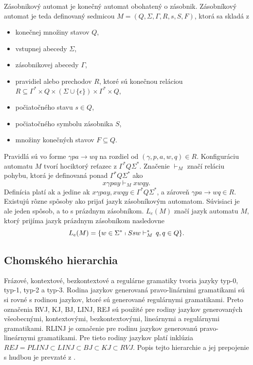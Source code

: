 \begin{definition}
\label{def:zasaut}
Zásobnikový automat je konečný automat obohatený o zásobnik. Zásobníkový automat je teda definovaný sedmicou $M = (Q,\Sigma, \Gamma , R,s,S,F)$, ktorá sa skladá z
\begin{itemize}\itemsep0.05em
    \item konečnej množiny stavov $Q$,
    \item vstupnej abecedy $\Sigma$,
    \item zásobnikovej abecedy $\Gamma$,
    \item pravidiel alebo prechodov $R$, ktoré sú konečnou reláciou $R \subseteq \Gamma^* \times Q \times (\Sigma \cup \{\epsilon\}) \times \Gamma^* \times Q$,
    \item počiatočného stavu $s \in Q$,
    \item počiatočného symbolu zásobnika $S$,
    \item množiny konečných stavov $F \subseteq Q$.
\end{itemize}
Pravidlá sú vo forme $\gamma pa \rightarrow wq$ na rozdiel od $(\gamma , p, a, w, q) \in R$. Konfiguráciu automatu $M$ tvorí hociktorý reťazec z $\Gamma^* Q\Sigma^*$. Značenie $\vdash_M$ značí reláciu pohybu, ktorá je definovaná ponad $\Gamma^* Q\Sigma^*$ ako $$x\gamma pay \vdash_M xwqy.$$ Definícia platí ak a jedine ak $x\gamma pay, xwqy \in \Gamma^* Q\Sigma^*$, a zároveň $\gamma pa \rightarrow wq \in R$. Existujú rôzne spôsoby ako prijať jazyk zásobníkovým automatom. Súvisiaci je ale jeden spôsob, a to s prázdnym zásobníkom. $L_e(M)$ značí jazyk automatu $M$, ktorý prijíma jazyk prázdnym zásobníkom nasledovne $$L_e(M) = \{w \in \Sigma^* \shortmid Ssw \vdash_M^* \,q,q \in Q\}.$$
\end{definition}

\subsection{Chomského hierarchia}
Frázové, kontextové, bezkontextové a regulárne gramatiky tvoria jazyky typ-0, typ-1, typ-2 a typ-3. Rodina jazykov generovaná pravo-linárnimi gramatikami sú si rovné s rodinou jazykov, ktoré sú generované regulárnymi gramatikami. Preto označenia RVJ, KJ, BJ, LINJ, REJ sú použité pre rodiny jazykov generovaných všeobecnými, kontextovými, bezkontextovými, lineárnymi a regulárnymi gramatikami. RLINJ je označenie pre rodinu jazykov generovanú pravo-lineárnymi gramatikami. Pre tieto rodiny jazykov platí inklúzia $REJ = PLINJ \subset LINJ \subset BJ \subset KJ \subset RVJ$. Popis tejto hierarchie a jej prepojenie s hudbou je prevzaté z \cite{jstorgrammusic, musicformallang}.

